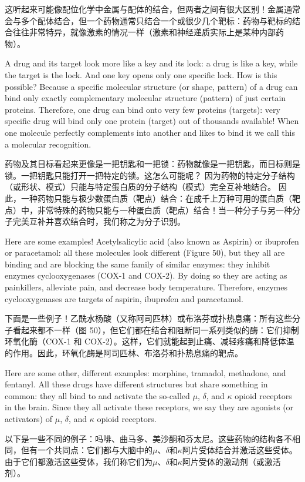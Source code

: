 \documentclass[dvipsnames, svgnames,a4paper,11pt]{article}
\begin{document}
这听起来可能像配位化学中金属与配体的结合，但两者之间有很大区别！金属通常会与多个配体结合，但一个药物通常只结合一个或很少几个靶标：药物与靶标的结合往往非常特异，就像激素的情况一样（激素和神经递质实际上是某种内部药物）。

A drug and its target look more like a key and its lock: a drug is like a key, while the target is the lock. And one key opens only one specific lock. How is this possible? Because a specific molecular structure (or shape, pattern) of a drug can bind only exactly complementary molecular structure (pattern) of just certain proteins. Therefore, one drug can bind onto very few proteins (targets): very specific drug will bind only one protein (target) out of thousands available! When one molecule perfectly complements into another and likes to bind it we call this a molecular recognition.

药物及其目标看起来更像是一把钥匙和一把锁：药物就像是一把钥匙，而目标则是锁。一把钥匙只能打开一把特定的锁。这怎么可能呢？ 因为药物的特定分子结构（或形状、模式）只能与特定蛋白质的分子结构（模式）完全互补地结合。 因此，一种药物只能与极少数蛋白质（靶点）结合：在成千上万种可用的蛋白质（靶点）中，非常特殊的药物只能与一种蛋白质（靶点）结合！当一种分子与另一种分子完美互补并喜欢结合时，我们称之为分子识别。

Here are some examples! Acetylsalicylic acid (also known as Aspirin) or ibuprofen or paracetamol: all these molecules look different (Figure 50), but they all are binding and are blocking the same family of similar enzymes: they inhibit enzymes cyclooxygenases (COX-1 and COX-2). By doing so they are acting as painkillers, alleviate pain, and decrease body temperature. Therefore, enzymes cyclooxygenases are targets of aspirin, ibuprofen and paracetamol.

下面是一些例子！乙酰水杨酸（又称阿司匹林）或布洛芬或扑热息痛：所有这些分子看起来都不一样（图 50），但它们都在结合和阻断同一系列类似的酶：它们抑制环氧化酶（COX-1 和 COX-2）。这样，它们就能起到止痛、减轻疼痛和降低体温的作用。因此，环氧化酶是阿司匹林、布洛芬和扑热息痛的靶点。

Here are some other, different examples: morphine, tramadol, methadone, and fentanyl. All these drugs have different structures but share something in common: they all bind to and activate the so-called $\mu$, $\delta$, and $\kappa$ opioid receptors in the brain. Since they all activate these receptors, we say they are agonists (or activators) of $\mu$, $\delta$, and $\kappa$ opioid receptors.

以下是一些不同的例子：吗啡、曲马多、美沙酮和芬太尼。这些药物的结构各不相同，但有一个共同点：它们都与大脑中的$\mu$、$\delta$和$\kappa$阿片受体结合并激活这些受体。由于它们都激活这些受体，我们称它们为$\mu$、$\delta$和$\kappa$阿片受体的激动剂（或激活剂）。
\end{document}
